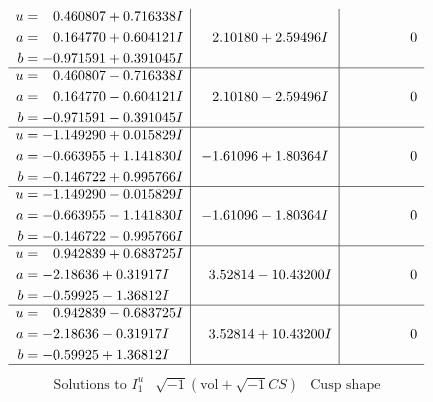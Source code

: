 \documentclass[1p]{elsarticle_modified}
\theoremstyle{definition}
\newcommand{\I}{\sqrt{-1}}
\begin{document}
$$\begin{array}{c|c|c}
\begin{aligned}
u &= \phantom{-}0.460807 + 0.716338 I \\
a &= \phantom{-}0.164770 + 0.604121 I \\
b &= -0.971591 + 0.391045 I\end{aligned}
 & \phantom{-}2.10180 + 2.59496 I & \phantom{-0.000000 } 0 \\ \hline\begin{aligned}
u &= \phantom{-}0.460807 - 0.716338 I \\
a &= \phantom{-}0.164770 - 0.604121 I \\
b &= -0.971591 - 0.391045 I\end{aligned}
 & \phantom{-}2.10180 - 2.59496 I & \phantom{-0.000000 } 0 \\ \hline\begin{aligned}
u &= -1.149290 + 0.015829 I \\
a &= -0.663955 + 1.141830 I \\
b &= -0.146722 + 0.995766 I\end{aligned}
 & -1.61096 + 1.80364 I & \phantom{-0.000000 } 0 \\ \hline\begin{aligned}
u &= -1.149290 - 0.015829 I \\
a &= -0.663955 - 1.141830 I \\
b &= -0.146722 - 0.995766 I\end{aligned}
 & -1.61096 - 1.80364 I & \phantom{-0.000000 } 0 \\ \hline\begin{aligned}
u &= \phantom{-}0.942839 + 0.683725 I \\
a &= -2.18636 + 0.31917 I \\
b &= -0.59925 - 1.36812 I\end{aligned}
 & \phantom{-}3.52814 - 10.43200 I & \phantom{-0.000000 } 0 \\ \hline\begin{aligned}
u &= \phantom{-}0.942839 - 0.683725 I \\
a &= -2.18636 - 0.31917 I \\
b &= -0.59925 + 1.36812 I\end{aligned}
 & \phantom{-}3.52814 + 10.43200 I & \phantom{-0.000000 } 0\\
 \hline 
 \end{array}$$\newpage$$\begin{array}{c|c|c}  
\text{Solutions to }I^u_{1}& \I (\text{vol} + \sqrt{-1}CS) & \text{Cusp shape}\\
 \hline 
\begin{aligned}

\end{aligned}
\end{array}$$
\end{document}

